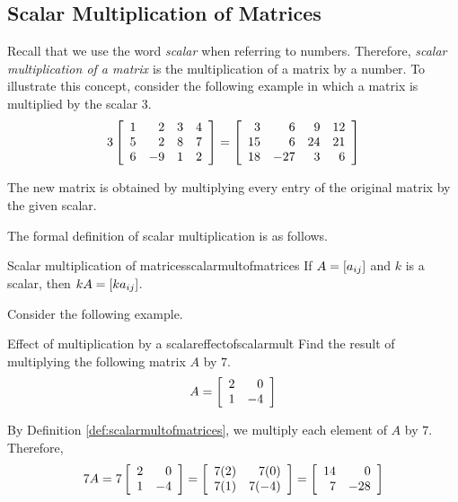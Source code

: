 \subsection{Scalar Multiplication of Matrices}

Recall that we use the word {\em scalar \em}when referring to numbers. Therefore, {\em scalar multiplication of a matrix \em}is the multiplication of a matrix by a number.  
To illustrate this concept, consider the following example in which a
matrix is multiplied by the scalar $3$.
\begin{equation*}
3\left[
\begin{array}{rrrr}
1 & 2 & 3 & 4 \\
5 & 2 & 8 & 7 \\
6 & -9 & 1 & 2
\end{array}
\right] = \left[
\begin{array}{rrrr}
3 & 6 & 9 & 12 \\
15 & 6 & 24 & 21 \\
18 & -27 & 3 & 6
\end{array}
\right] 
\end{equation*}

The new matrix is obtained by multiplying every entry of the original matrix
by the given scalar. 

The formal definition of scalar multiplication is as follows.

\begin{definition}{Scalar multiplication of matrices}{scalarmultofmatrices}
If $A=\left[ a_{ij}\right] $ and $k$ is a scalar,
then $kA=\left[ ka_{ij}\right]$.
\end{definition}

Consider the following example.

\begin{example}{Effect of multiplication by a scalar}{effectofscalarmult}
Find the result of multiplying the following matrix $A$ by $7$.
\begin{equation*}
A=\left[
\begin{array}{rr}
2 & 0 \\
1 & -4
\end{array}
\right]
\end{equation*}
\end{example}

\begin{solution}
By Definition \ref{def:scalarmultofmatrices}, we multiply each element of $A$ by $7$.
Therefore,
\begin{equation*}
7A = 
7\left[
\begin{array}{rr}
2 & 0 \\
1 & -4
\end{array}
\right] =
\left[
\begin{array}{rr}
7(2) & 7(0) \\
7(1) & 7(-4)
\end{array}
\right] =
\left[
\begin{array}{rr}
14 & 0 \\
7 & -28
\end{array}
\right]
\end{equation*}
\end{solution}

